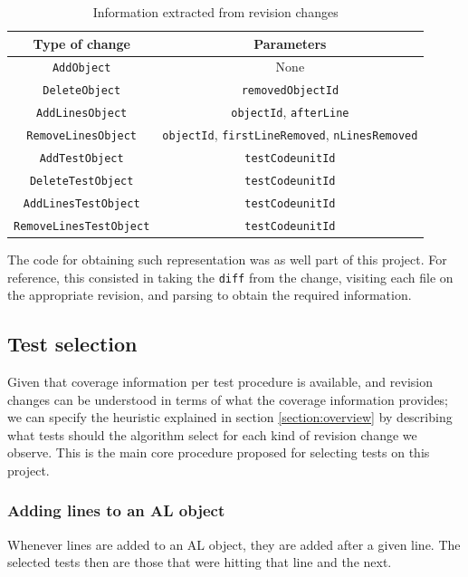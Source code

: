 \documentclass{article}
\begin{document}
\begin{table}[h!]
\centering
\begin{tabular}{||c c||} 
 \hline
 Type of change & Parameters \\
 \hline\hline
 \texttt{AddObject} & None\\
 \texttt{DeleteObject} & \texttt{removedObjectId} \\
 \texttt{AddLinesObject} & \texttt{objectId}, \texttt{afterLine} \\
 \texttt{RemoveLinesObject} & \texttt{objectId}, \texttt{firstLineRemoved}, \texttt{nLinesRemoved} \\
 \texttt{AddTestObject} & \texttt{testCodeunitId} \\
 \texttt{DeleteTestObject} & \texttt{testCodeunitId} \\
 \texttt{AddLinesTestObject} & \texttt{testCodeunitId} \\
 \texttt{RemoveLinesTestObject} & \texttt{testCodeunitId} \\
 \hline
\end{tabular}
\caption{Information extracted from revision changes}
\label{table:revision-changes}
\end{table}

The code for obtaining such representation was as well part of this project. For reference, this consisted in taking the \texttt{diff} from the change, visiting each file on the appropriate revision, and parsing to obtain the required information.

\subsection{Test selection}\label{section:test-selection}

Given that coverage information per test procedure is available, and revision changes can be understood in terms of what the coverage information provides; we can specify the heuristic explained in section \ref{section:overview} by describing what tests should the algorithm select for each kind of revision change we observe. This is the main core procedure proposed for selecting tests on this project.

\subsubsection{Adding lines to an AL object}
Whenever lines are added to an AL object, they are added after a given line. The selected tests then are those that were hitting that line and the next.
\end{document}
